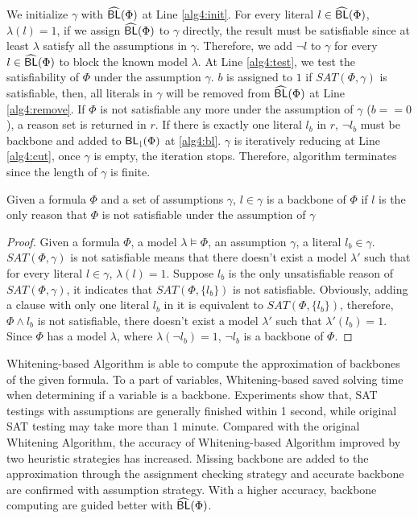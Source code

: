 We initialize $\gamma$ with ${\sf \widehat{BL}}(\Phi)$ at Line \ref{alg4:init}. For every literal $l\in{\sf \widehat{BL}}(\Phi)$, $\lambda(l)=1$, if we assign ${\sf \widehat{BL}}(\Phi)$ to $\gamma$ directly, the result must be satisfiable since at least $\lambda$ satisfy all the assumptions in $\gamma$. Therefore, we add $\neg l$ to $\gamma$ for every $l\in{\sf \widehat{BL}}(\Phi)$ to block the known model $\lambda$. At Line \ref{alg4:test}, we test the satisfiability of $\Phi$ under the assumption $\gamma$. $b$ is assigned to $1$ if $SAT(\Phi,\gamma)$ is satisfiable, then, all literals in $\gamma$ will be removed from ${\sf \widehat{BL}}(\Phi)$ at Line \ref{alg4:remove}. If $\Phi$ is not satisfiable any more under the assumption of $\gamma$ ($b==0$), a reason set is returned in $r$. If there is exactly one literal $l_b$ in $r$, $\neg l_b$ must be backbone and added to ${\sf {BL}_\downharpoonright}(\Phi)$ at \ref{alg4:bl}. $\gamma$ is iteratively reducing at Line \ref{alg4:cut}, once $\gamma$ is empty, the iteration stops. Therefore, algorithm terminates since the length of $\gamma$ is finite.

\begin{theorem}
Given a formula $\Phi$ and a set of assumptions $\gamma$, $l\in\gamma$ is a backbone of $\Phi$ if $l$ is the only reason that $\Phi$ is not satisfiable under the assumption of $\gamma$
\end{theorem}

\begin{proof}
Given a formula $\Phi$, a model $\lambda\models\Phi$, an assumption $\gamma$, a literal $l_b\in\gamma$. $SAT(\Phi,\gamma)$ is not satisfiable means that there doesn't exist a model $\lambda'$ such that for every literal $l\in\gamma$, $\lambda(l)=1$. Suppose $l_b$ is the only unsatisfiable reason of $SAT(\Phi,\gamma)$, it indicates that $SAT(\Phi, \{l_b\})$ is not satisfiable. Obviously, adding a clause with only one literal $l_b$ in it is equivalent to $SAT(\Phi,\{l_b\})$, therefore, $\Phi\wedge l_b$ is not satisfiable, there doesn't exist a model $\lambda'$ such that $\lambda'(l_b)=1$. Since $\Phi$ has a model $\lambda$, where $\lambda(\neg l_b)=1$, $\neg l_b$ is a backbone of $\Phi$.
\end{proof}

Whitening-based Algorithm is able to compute the approximation of backbones of the given formula. To a part of variables, Whitening-based saved solving time when determining if a variable is a backbone. Experiments show that, SAT testings with assumptions are generally finished within 1 second, while original SAT testing may take more than 1 minute. Compared with the original Whitening Algorithm, the accuracy of Whitening-based Algorithm improved by two heuristic strategies has increased. Missing backbone are added to the approximation through the assignment checking strategy and accurate backbone are confirmed with assumption strategy. With a higher accuracy, backbone computing are guided better with ${\sf \widehat{BL}}(\Phi)$.
